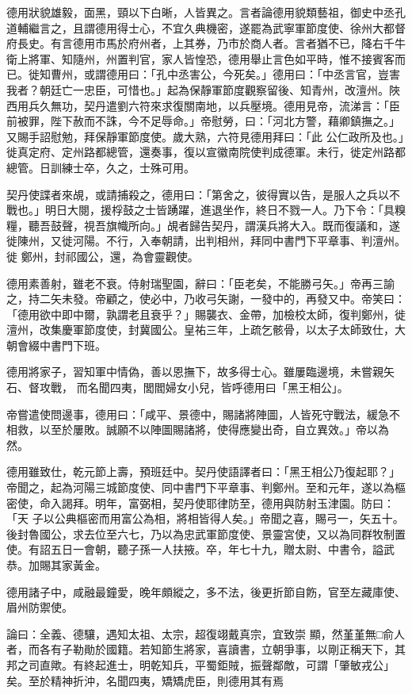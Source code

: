 \begin{pinyinscope}
 德用狀貌雄毅，面黑，頸以下白晰，人皆異之。言者論德用貌類藝祖，御史中丞孔道輔繼言之，且謂德用得士心，不宜久典機密，遂罷為武寧軍節度使、徐州大都督府長史。有言德用市馬於府州者，上其券，乃市於商人者。言者猶不已，降右千牛
 衛上將軍、知隨州，州置判官，家人皆惶恐，德用舉止言色如平時，惟不接賓客而已。徙知曹州，或謂德用曰：「孔中丞害公，今死矣。」德用曰：「中丞言官，豈害我者？朝廷亡一忠臣，可惜也。」起為保靜軍節度觀察留後、知青州，改澶州。陜西用兵久無功，契丹遣劉六符來求復關南地，以兵壓境。德用見帝，流涕言：「臣前被罪，陛下赦而不誅，今不足辱命。」帝慰勞，曰：「河北方警，藉卿鎮撫之。」又賜手詔慰勉，拜保靜軍節度使。歲大熟，六符見德用拜曰：「此
 公仁政所及也。」徙真定府、定州路都總管，還奏事，復以宣徽南院使判成德軍。未行，徙定州路都總管。日訓練士卒，久之，士殊可用。



 契丹使諜者來覘，或請捕殺之，德用曰：「第舍之，彼得實以告，是服人之兵以不戰也。」明日大閱，援桴鼓之士皆踴躍，進退坐作，終日不戮一人。乃下令：「具糗糧，聽吾鼓聲，視吾旗幟所向。」覘者歸告契丹，謂漢兵將大入。既而復議和，遂徙陳州，又徙河陽。不行，入奉朝請，出判相州，拜同中書門下平章事、判澶州。徙
 鄭州，封祁國公，還，為會靈觀使。



 德用素善射，雖老不衰。侍射瑞聖園，辭曰：「臣老矣，不能勝弓矢。」帝再三諭之，持二矢未發。帝顧之，使必中，乃收弓矢謝，一發中的，再發又中。帝笑曰：「德用欲中即中爾，孰謂老且衰乎？」賜襲衣、金帶，加檢校太師，復判鄭州，徙澶州，改集慶軍節度使，封冀國公。皇祐三年，上疏乞骸骨，以太子太師致仕，大朝會綴中書門下班。



 德用將家子，習知軍中情偽，善以恩撫下，故多得士心。雖屢臨邊境，未嘗親矢石、督攻戰，
 而名聞四夷，閭閻婦女小兒，皆呼德用曰「黑王相公」。



 帝嘗遣使問邊事，德用曰：「咸平、景德中，賜諸將陣圖，人皆死守戰法，緩急不相救，以至於屢敗。誠願不以陣圖賜諸將，使得應變出奇，自立異效。」帝以為然。



 德用雖致仕，乾元節上壽，預班廷中。契丹使語譯者曰：「黑王相公乃復起耶？」帝聞之，起為河陽三城節度使、同中書門下平章事、判鄭州。至和元年，遂以為樞密使，命入謁拜。明年，富弼相，契丹使耶律防至，德用與防射玉津園。防曰：「天
 子以公典樞密而用富公為相，將相皆得人矣。」帝聞之喜，賜弓一，矢五十。後封魯國公，求去位至六七，乃以為忠武軍節度使、景靈宮使，又以為同群牧制置使。有詔五日一會朝，聽子孫一人扶掖。卒，年七十九，贈太尉、中書令，謚武恭。加賜其家黃金。



 德用諸子中，咸融最鐘愛，晚年頗縱之，多不法，後更折節自飭，官至左藏庫使、眉州防禦使。



 論曰：全義、德驤，遇知太祖、太宗，超復翊戴真宗，宜致崇
 顯，然堇堇無□俞人者，而各有子勒勛於國籍。若知節生將家，喜讀書，立朝爭事，以剛正稱天下，其邦之司直歟。有終起進士，明乾知兵，平蜀鉅賊，振聲鄰敵，可謂「肇敏戎公」矣。至於精神折沖，名聞四夷，矯矯虎臣，則德用其有焉



\end{pinyinscope}